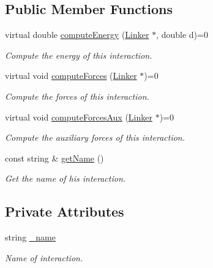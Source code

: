 \subsection*{Public Member Functions}
\begin{DoxyCompactItemize}
\item 
virtual double \hyperlink{classLinkerInteractions_a2a046f0a12eb6fb66bad29a4694eeebe}{compute\+Energy} (\hyperlink{classLinker}{Linker} $\ast$, double d)=0
\begin{DoxyCompactList}\small\item\em Compute the energy of this interaction. \end{DoxyCompactList}\item 
virtual void \hyperlink{classLinkerInteractions_ae27fb47c805254010bcff92e63c555b4}{compute\+Forces} (\hyperlink{classLinker}{Linker} $\ast$)=0
\begin{DoxyCompactList}\small\item\em Compute the forces of this interaction. \end{DoxyCompactList}\item 
virtual void \hyperlink{classLinkerInteractions_ab7469e00be350a83de630c7ea7a4adb8}{compute\+Forces\+Aux} (\hyperlink{classLinker}{Linker} $\ast$)=0
\begin{DoxyCompactList}\small\item\em Compute the auxiliary forces of this interaction. \end{DoxyCompactList}\item 
const string \& \hyperlink{classLinkerInteractions_a019c8595b26cab389d3392bbe2eb9f6e}{get\+Name} ()
\begin{DoxyCompactList}\small\item\em Get the name of his interaction. \end{DoxyCompactList}\end{DoxyCompactItemize}
\subsection*{Private Attributes}
\begin{DoxyCompactItemize}
\item 
string \hyperlink{classLinkerInteractions_af436c1bf2a53670f23849187c203d568}{\+\_\+name}
\begin{DoxyCompactList}\small\item\em Name of interaction. \end{DoxyCompactList}\end{DoxyCompactItemize}


